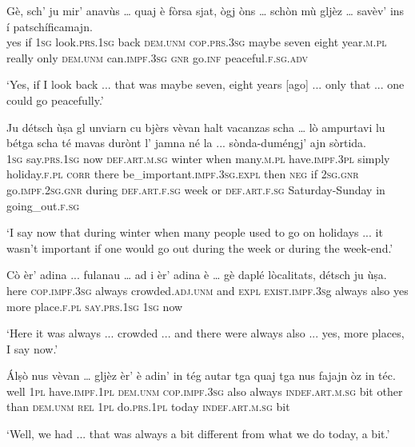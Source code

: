\begin{linenumbers}
	\gll Gè, sch’ ju mir’ anavùs … quaj è fòrsa sjat, ògj òns … schòn mù gljèz … savèv’ ins í patschíficamajn.   \\
	yes if \textsc{1sg} look.\textsc{prs.1sg} back {} \textsc{dem.unm} \textsc{cop.prs.3sg} maybe seven eight year.\textsc{m.pl} {} really only \textsc{dem.unm} {} can.\textsc{impf.3sg} \textsc{gnr} go.\textsc{inf} peaceful.\textsc{f.sg.adv}\\
\end{linenumbers}
\medskip
\glt `Yes, if I look back ... that was maybe seven, eight years [ago] ... only that ... one could go peacefully.'
\medskip

\begin{linenumbers}
	\gll Ju détsch ùṣa gl unviarn cu bjèrs vèvan halt vacanzas scha … lò ampurtavi lu bétga scha té mavas durònt l’ jamna né la ... sònda-duméngj’ ajn sòrtida.   \\
	\textsc{1sg} say.\textsc{prs.1sg} now \textsc{def.art.m.sg} winter when many.\textsc{m.pl} have.\textsc{impf.3pl} simply holiday.\textsc{f.pl} \textsc{corr} {} there be\_important.\textsc{impf.3sg.expl} then \textsc{neg} if \textsc{2sg.gnr} go.\textsc{impf.2sg.gnr} during \textsc{def.art.f.sg} week or \textsc{def.art.f.sg} {} Saturday-Sunday in going\_out.\textsc{f.sg}\\
\end{linenumbers}
\medskip
\glt `I say now that during winter when many people used to go on holidays ... it wasn't important if one would go out during the week or during the week-end.'
\medskip

\begin{linenumbers}
	\gll  Cò èr’ adina ... fulanau … ad i èr’ adina è … gè daplé lòcalitats, détsch ju ùṣa.  \\
	here \textsc{cop.impf.3sg} always {} crowded.\textsc{adj.unm} {} and \textsc{expl} \textsc{exist.impf.3s}g always also {} yes more place.\textsc{f.pl} \textsc{say.prs.1sg} \textsc{1sg} now \\
\end{linenumbers}
\medskip
\glt `Here it was always ... crowded ... and there were always also ... yes, more places, I say now.'
\medskip

\begin{linenumbers}
	\gll  Álṣò nus vèvan … gljèz èr’ è adin’ in tég autar tga quaj tga nus fajajn òz in téc.  \\
	well \textsc{1pl} have.\textsc{impf.1pl} {} \textsc{dem.unm} \textsc{cop.impf.3sg} also always \textsc{indef.art.m.sg} bit other than \textsc{dem.unm} \textsc{rel} \textsc{1pl} do.\textsc{prs.1pl} today \textsc{indef.art.m.sg} bit\\
\end{linenumbers}
\medskip
\glt `Well, we had ... that was always a bit different from what we do today, a bit.'
\medskip

